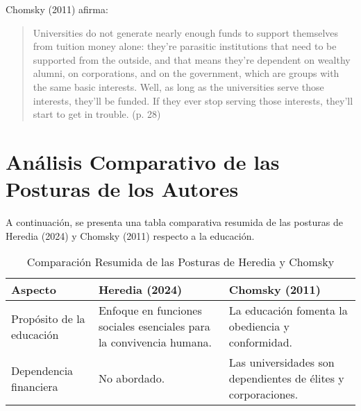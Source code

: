 \documentclass[man]{apa7}  %
\begin{document}
Chomsky (2011) afirma:

\begin{quote}
    Universities do not generate nearly enough funds to support themselves from tuition money alone: they’re parasitic institutions that need to be supported from the outside, and that means they’re dependent on wealthy alumni, on corporations, and on the government, which are groups with the same basic interests. Well, as long as the universities serve those interests, they’ll be funded. If they ever stop serving those interests, they’ll start to get in trouble. (p. 28)
\end{quote}



\appendix

\section{Análisis Comparativo de las Posturas de los Autores}\label{appendix}

A continuación, se presenta una tabla comparativa resumida de las posturas de Heredia (2024) y Chomsky (2011) respecto a la educación.

\begin{table}
\centering
\caption{Comparación Resumida de las Posturas de Heredia y Chomsky}
\begin{tabular}{l p{6cm} p{6cm}}
\toprule
\textbf{Aspecto} & \textbf{Heredia (2024)} & \textbf{Chomsky (2011)} \\
\midrule
Propósito de la educación & Enfoque en funciones sociales esenciales para la convivencia humana. & La educación fomenta la obediencia y conformidad. \\
Dependencia financiera & No abordado. & Las universidades son dependientes de élites y corporaciones. \\
\bottomrule
\end{tabular}
\end{table}
\end{document}
